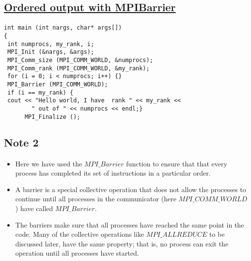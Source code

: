\documentclass[%
oneside,                 %
final,                   %
10pt]{article}
\begin{document}
\subsection*{\href{{https://github.com/CompPhysics/ComputationalPhysics2/blob/gh-pages/doc/Programs/LecturePrograms/programs/MPI/chapter07/program3.cpp}}{Ordered output with MPIBarrier}}

\paragraph{}














\begin{verbatim}
int main (int nargs, char* args[])
{
 int numprocs, my_rank, i;
 MPI_Init (&nargs, &args);
 MPI_Comm_size (MPI_COMM_WORLD, &numprocs);
 MPI_Comm_rank (MPI_COMM_WORLD, &my_rank);
 for (i = 0; i < numprocs; i++) {}
 MPI_Barrier (MPI_COMM_WORLD);
 if (i == my_rank) {
 cout << "Hello world, I have  rank " << my_rank << 
        " out of " << numprocs << endl;}
      MPI_Finalize ();

\end{verbatim}



\subsection*{Note 2}

\paragraph{}
\begin{itemize}
\item Here we have used the $MPI\_Barrier$ function to ensure that that every process has completed  its set of instructions in  a particular order.

\item A barrier is a special collective operation that does not allow the processes to continue until all processes in the communicator (here $MPI\_COMM\_WORLD$) have called $MPI\_Barrier$. 

\item The barriers make sure that all processes have reached the same point in the code. Many of the collective operations like $MPI\_ALLREDUCE$ to be discussed later, have the same property; that is, no process can exit the operation until all processes have started. 
\end{itemize}
\end{document}
